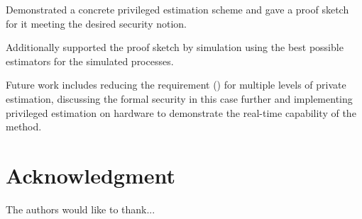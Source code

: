 \documentclass[conference]{IEEEtran}
\theoremstyle{definition}
\theoremstyle{definition}
\theoremstyle{remark}
\begin{document}
Demonstrated a concrete privileged estimation scheme and gave a proof sketch for it meeting the desired security notion.

Additionally supported the proof sketch by simulation using the best possible estimators for the simulated processes.

Future work includes reducing the requirement () for multiple levels of private estimation, discussing the formal security in this case further and implementing privileged estimation on hardware to demonstrate the real-time capability of the method.


\section*{Acknowledgment}
The authors would like to thank...




\end{document}
